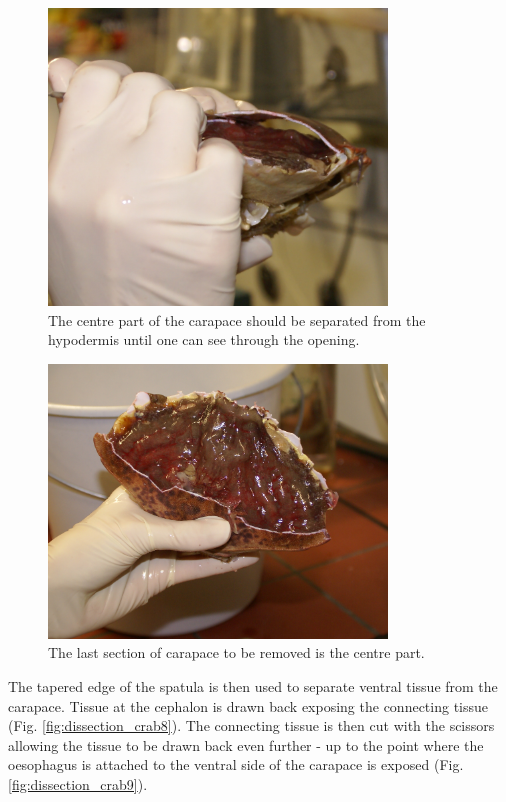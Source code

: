 \begin{figure}[H]
	\begin{center}
		\includegraphics[width=9cm]{graphics/dissection_crab6.png}
		\caption{The centre part of the carapace should be separated from the hypodermis until one can see through the opening.}
		\label{fig:dissection_crab6}
	\end{center}
\end{figure}
\begin{figure}[H]
	\begin{center}
		\includegraphics[width=9cm]{graphics/dissection_crab7.png}
		\caption{The last section of carapace to be removed is the centre part.}
		\label{fig:dissection_crab7}
	\end{center}
\end{figure}

The tapered edge of the spatula is then used to separate ventral tissue from the carapace. Tissue at the cephalon is drawn back exposing the connecting tissue (Fig. \ref{fig:dissection_crab8}). The connecting tissue is then cut with the scissors allowing the tissue to be drawn back even further - up to the point where the oesophagus is attached to the ventral side of the carapace is exposed (Fig. \ref{fig:dissection_crab9}).

